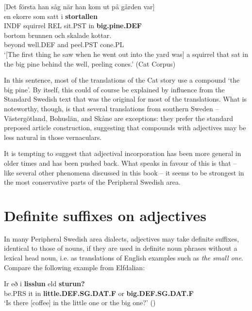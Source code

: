 \ea\label{}
{}[Det första han såg när han kom ut på gården var]\\
\gll en  ekorre  som  satt  i  \textbf{stortallen}\\
INDF  squirrel  REL  sit.PST  in  \textbf{big.pine.DEF}\\
\gll bortom  brunnen  och  skalade  kottar.\\
beyond  well.DEF  and  peel.PST  cone.PL\\
\glt ‘[The first thing he saw when he went out into the yard was] a squirrel that sat in the big pine behind the well, peeling cones.’ (Cat Corpus)
\z

In this sentence, most of the translations of the Cat story use a compound  ‘the big pine’. By itself, this could of course be explained by influence from the Standard Swedish text that was the original for most of the translations. What is noteworthy, though, is that several translations from southern Sweden – Västergötland, Bohuslän, and Skåne are exceptions: they prefer the standard preposed article construction, suggesting that compounds with adjectives may be less natural in those vernaculars.

It is tempting to suggest that adjectival incorporation has been more general in older times and has been pushed back. What speaks in favour of this is that – like several other phenomena discussed in this book – it seems to be strongest in the most conservative parts of the Peripheral Swedish area. 

\section{Definite suffixes on adjectives}
\label{bkm:Ref155519944}

In many Peripheral Swedish area dialects, adjectives may take definite suffixes, identical to those of nouns, if they are used in definite noun phrases without a lexical head noun, i.e. as translations of English examples such as \textit{the small one}. Compare the following example from Elfdalian:

\ea\label{}
\gll Ir  eð  i  \textbf{lisslun} eld  \textbf{sturun?}\\
be.PRS  it  in  \textbf{little.DEF.SG.DAT.F} or  \textbf{big.DEF.SG.DAT.F}\\
\glt ‘Is there [coffee] in the little one or the big one?’ (\citet[53]{Levander1909})
\z

